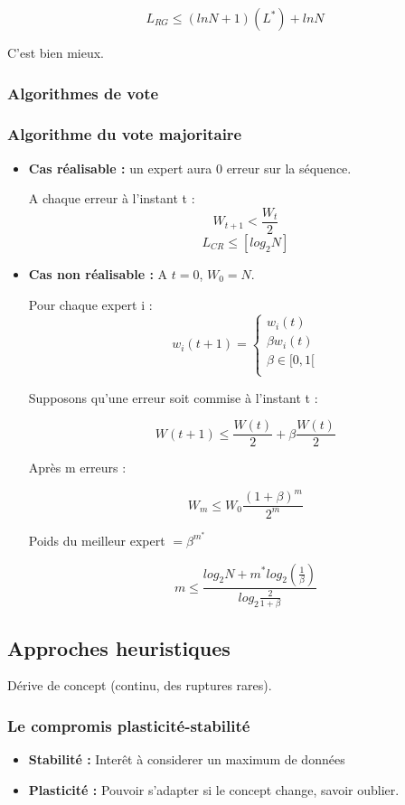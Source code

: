 \documentclass{article}
\begin{document}
\[ L_{RG} \leq (ln N + 1)(L^{*}) + ln N \]

C'est bien mieux.

\subsubsection{Algorithmes de vote}

\subsubsection*{Algorithme du vote majoritaire}

\begin{itemize}
\item \textbf{Cas réalisable :} un expert aura 0 erreur sur la séquence.

A chaque erreur à l'instant t : 
\[ W_{t+1} < \frac{W_t}{2} \]
\[ L_{CR} \leq [log_2 N] \]

\item \textbf{Cas non réalisable :} A $t = 0$, $W_0 = N$.

Pour chaque expert i :
\[ w_{i}(t+1) = \begin{cases}
               w_{i}(t) \\
               \beta w_{i}(t) \\
               \beta \in [0, 1[ \\
              \end{cases}
\]

Supposons qu'une erreur soit commise à l'instant t :

\[ W(t+1) \leq \frac{W(t)}{2} + \beta \frac{W(t)}{2} \]

Après m erreurs : 

\[ W_m \leq W_0 \frac{(1 + \beta)^m}{2^m} \]

\begin{center}
Poids du meilleur expert $ = \beta^{m^{*}} $
\end{center}

\[ m \leq \frac{log_2 N + m^{*} log_2 (\frac{1}{\beta})}{log_2 \frac{2}{1 + \beta}} \]

\end{itemize}

\subsection{Approches heuristiques}

Dérive de concept (continu, des ruptures rares).

\subsubsection*{Le compromis plasticité-stabilité}

\begin{itemize}
\item \textbf{Stabilité :} Interêt à considerer un maximum de données
\item \textbf{Plasticité :} Pouvoir s'adapter si le concept change, savoir oublier.
\end{itemize}
\end{document}
